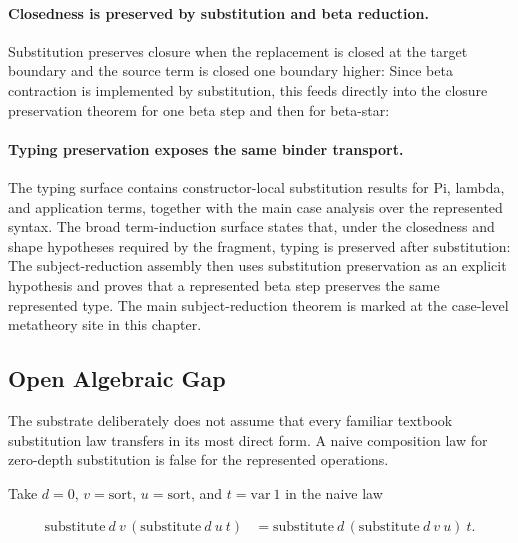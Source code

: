 \paragraph{Closedness is preserved by substitution and beta reduction.}
Substitution preserves closure when the replacement is closed at the target
boundary and the source term is closed one boundary higher:
Since beta contraction is implemented by substitution, this feeds directly into
the closure preservation theorem for one beta step and then for beta-star:

\paragraph{Typing preservation exposes the same binder transport.}
The typing surface contains constructor-local substitution results for Pi,
lambda, and application terms, together with the main case analysis over the
represented syntax. The broad term-induction surface states that, under the
closedness and shape hypotheses required by the fragment, typing is preserved
after substitution:
The subject-reduction assembly then uses substitution preservation as an
explicit hypothesis and proves that a represented beta step preserves the same
represented type. The main subject-reduction theorem is marked at the
case-level metatheory site in this chapter.

\subsection{Open Algebraic Gap}
\label{subsec:substrate-open-algebraic-gap}

The substrate deliberately does not assume that every familiar textbook
substitution law transfers in its most direct form. A naive composition law for
zero-depth substitution is false for the represented operations.

Take $d=0$, $v=\mathrm{sort}$, $u=\mathrm{sort}$, and $t=\mathrm{var}\ 1$ in
the naive law

$$
\begin{aligned}
\mathrm{substitute}\ d\ v\,
  (\mathrm{substitute}\ d\ u\ t)
&=
\mathrm{substitute}\ d\,
  (\mathrm{substitute}\ d\ v\ u)\ t.
\end{aligned}
$$

